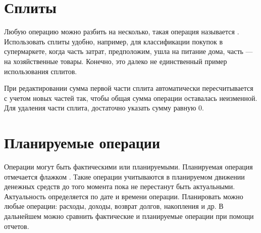\documentclass[a4paper,10pt,russian]{sphinxmanual}
\begin{document}
\section{Сплиты}
\label{\detokenize{transactions:id3}}
Любую операцию можно разбить на несколько, такая операция называется {\hyperref[\detokenize{glossary:term}]{}}. Использовать сплиты удобно, например,
для классификации покупок в супермаркете, когда часть затрат, предположим, ушла на питание дома, часть — на
хозяйственные товары. Конечно, это далеко не единственный пример использования сплитов.

При редактировании сумма первой части сплита автоматически пересчитывается с учетом новых частей так, чтобы
общая сумма операции оставалась неизменной. Для удаления части сплита, достаточно указать сумму равную 0.

\noindent{}
\noindent{}
\noindent{}
\noindent{}
\noindent{}


\section{Планируемые операции}
\label{\detokenize{transactions:id4}}
Операции могут быть фактическими или планируемыми. Планируемая операция отмечается флажком . Такие операции
учитываются в планируемом движении денежных средств до того момента пока не перестанут быть актуальными.
Актуальность определяется по дате и времени операции. Планировать можно любые операции: расходы, доходы,
возврат долгов, накопления и др. В дальнейшем можно сравнить фактические и планируемые операции при помощи отчетов.

\noindent{}
\end{document}
